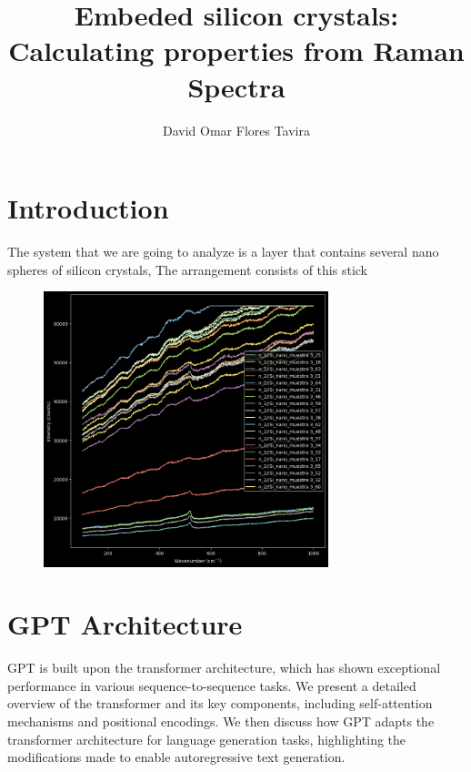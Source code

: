 \documentclass[a4paper,10pt,twocolumn]{article}
\title{Embeded silicon crystals: Calculating properties from Raman Spectra}
\author{David Omar Flores Tavira}
\begin{document}

\section{Introduction}
The system that we are going to analyze is a layer that contains several nano spheres of silicon crystals, The arrangement consists of this stick

\begin{figure}
  \centering
  \includegraphics[width=0.9\columnwidth, height=8cm]{all.png}
\end{figure}

\section{GPT Architecture}
GPT is built upon the transformer architecture, which has shown exceptional performance in various sequence-to-sequence tasks. We present a detailed overview of the transformer and its key components, including self-attention mechanisms and positional encodings. We then discuss how GPT adapts the transformer architecture for language generation tasks, highlighting the modifications made to enable autoregressive text generation.
\end{document}
